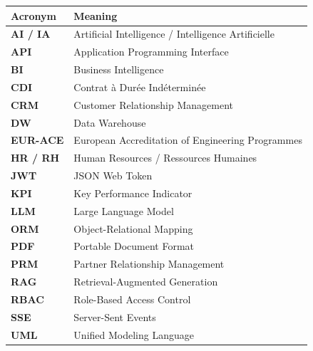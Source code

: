 \vspace{0.4em}
\renewcommand{\arraystretch}{1.35}
\noindent
\begin{tabular}{@{} >{\bfseries}l @{\hspace{1.2em}} l @{}}
\toprule
\normalfont\textbf{Acronym} & \textbf{Meaning} \\
\midrule
AI / IA  & Artificial Intelligence / Intelligence Artificielle \\
API      & Application Programming Interface \\
BI       & Business Intelligence \\
CDI      & Contrat à Durée Indéterminée \\
CRM      & Customer Relationship Management \\
DW       & Data Warehouse \\
EUR-ACE  & European Accreditation of Engineering Programmes \\
HR / RH  & Human Resources / Ressources Humaines \\
JWT      & JSON Web Token \\
KPI      & Key Performance Indicator \\
LLM      & Large Language Model \\
ORM      & Object-Relational Mapping \\
PDF      & Portable Document Format \\
PRM      & Partner Relationship Management \\
RAG      & Retrieval-Augmented Generation \\
RBAC     & Role-Based Access Control \\
SSE      & Server-Sent Events \\
UML      & Unified Modeling Language \\
\bottomrule
\end{tabular}
\renewcommand{\arraystretch}{1}
